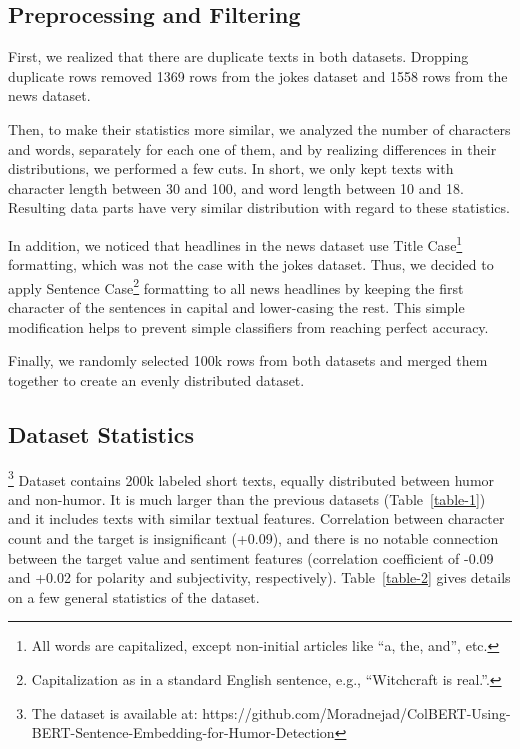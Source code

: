 \documentclass[journal]{IEEEtran}
\begin{document}
\subsection{Preprocessing and Filtering}

First, we realized that there are duplicate texts in both datasets. Dropping duplicate rows removed 1369 rows from the jokes dataset and 1558 rows from the news dataset.

Then, to make their statistics more similar, we analyzed the number of characters and words, separately for each one of them, and by realizing differences in their distributions, we performed a few cuts. In short, we only kept texts with character length between 30 and 100, and word length between 10 and 18. Resulting data parts have very similar distribution with regard to these statistics.

In addition, we noticed that headlines in the news dataset use Title Case\footnote{All words are capitalized, except non-initial articles like “a, the, and”, etc.} formatting, which was not the case with the jokes dataset. Thus, we decided to apply Sentence Case\footnote{Capitalization as in a standard English sentence, e.g., “Witchcraft is real.”.} formatting to all news headlines by keeping the first character of the sentences in capital and lower-casing the rest. This simple modification helps to prevent simple classifiers from reaching perfect accuracy.

Finally, we randomly selected 100k rows from both datasets and merged them together to create an evenly distributed dataset.

\subsection{Dataset Statistics}
\footnote{The dataset is available at: https://github.com/Moradnejad/ColBERT-Using-BERT-Sentence-Embedding-for-Humor-Detection}
Dataset contains 200k labeled short texts, equally distributed between humor and non-humor. It is much larger than the previous datasets (Table~\ref{table-1}) and it includes texts with similar textual features. Correlation between character count and the target is insignificant (+0.09), and there is no notable connection between the target value and sentiment features (correlation coefficient of -0.09 and +0.02 for polarity and subjectivity, respectively). Table~\ref{table-2} gives details on a few general statistics of the dataset.
\end{document}
